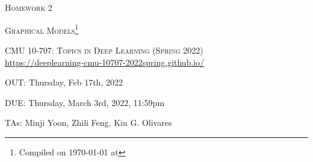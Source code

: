 \documentclass[12pt]{article}
\begin{document}
\section*{}
\begin{center}
  \centerline{\textsc{\LARGE  Homework 2}}
  \vspace{0.5em}
  \centerline{\textsc{\LARGE Graphical Models}\footnote{Compiled on \today{} at \currenttime{}}}
  \vspace{1em}
  \textsc{\large CMU 10-707: Topics in Deep Learning (Spring 2022)} \\
  \vspace{0.5em}
  \url{https://deeplearning-cmu-10707-2022spring.github.io/} \\
  \vspace{0.5em}
  \centerline{OUT: Thursday, Feb 17th, 2022}
  \vspace{0.5em}
  \centerline{DUE: Thursday, March 3rd, 2022, 11:59pm}
    \centerline{TAs: Minji Yoon, Zhili Feng, Kin G. Olivares}
\end{center}


\clearpage 

\clearpage

\clearpage

\clearpage

\clearpage

\clearpage

\clearpage
\end{document}
